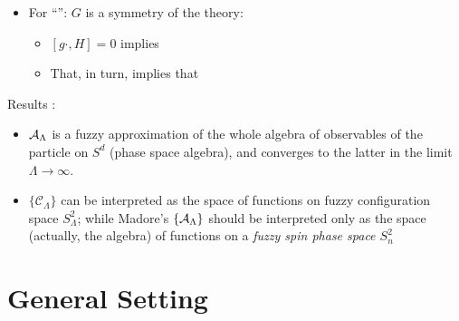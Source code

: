 {\begin{itemize}
        \item For ``'': $G$ is a symmetry of the theory:
            
            \begin{itemize}
                
            \item $[g\cdot , H] = 0$ implies 
            
            \item That, in turn, implies that 
                
            \end{itemize}
            
        \end{itemize}
    
    
    \lin
    
    Results \cite{FioreTheCase2020}:
        \begin{itemize}
        
        \item $\mathcal A_\Lambda$ is a fuzzy approximation of the whole algebra of observables of the particle on $S^d$ (phase space algebra), and converges to the latter in the limit $\Lambda \to \infty$.
        
        \item $\{\mathcal C_\Lambda\}$ can be interpreted as the space of functions on fuzzy configuration space $S^2_\Lambda$; while Madore's $\{\mathcal A_\Lambda\}$ should be interpreted only as the space (actually, the algebra) of functions on a \textit{fuzzy spin phase space $S^2_n$}
            
        \end{itemize}
    
}

\begin{definition}

\end{definition}

\linea

\section{General Setting}

    
    
